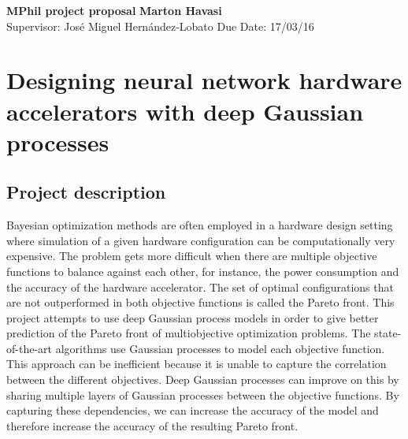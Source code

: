 \documentclass[a4paper, 11pt]{article}
\begin{document}
\newpage

\noindent
\large\textbf{MPhil project proposal} \hfill \textbf{Marton Havasi} \\
\normalsize Supervisor: Jos\'e Miguel Hern\'andez-Lobato \hfill Due Date: 17/03/16

\section*{Designing neural network hardware accelerators with deep Gaussian processes}

\subsection*{Project description}

Bayesian optimization methods are often employed in a hardware design setting where simulation of a given hardware configuration can be computationally very expensive. The problem gets more difficult when there are multiple objective functions to balance against each other, for instance, the power consumption and the accuracy of the hardware accelerator. The set of optimal configurations that are not outperformed in both objective functions is called the Pareto front. This project attempts to use deep Gaussian process models in order to give better prediction of the Pareto front of multiobjective optimization problems. The state-of-the-art algorithms use Gaussian processes to model each objective function. This approach can be inefficient because it is unable to capture the correlation between the different objectives. Deep Gaussian processes can improve on this by sharing multiple layers of Gaussian processes between the objective functions. By capturing these dependencies, we can increase the accuracy of the model and therefore increase the accuracy of the resulting Pareto front.
\end{document}
